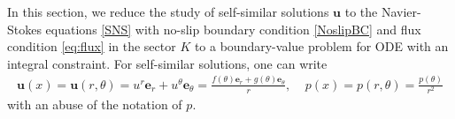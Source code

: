 \documentclass[reqno,12pt]{amsart}
\newcommand{\Bu}{{\boldsymbol{u}}}
\newcommand{\Be}{{\boldsymbol{e}}}
\begin{document}
In this section, we reduce the study of self-similar solutions $\Bu$ to the Navier-Stokes equations \eqref{SNS} with no-slip boundary condition \eqref{NoslipBC} and flux condition \eqref{eq:flux} in the sector $K$ to a boundary-value problem for ODE with an integral constraint. 
For self-similar solutions, one can  write
    \begin{align} \label{SSdec}
        \Bu(x)= \Bu(r,\theta)= u^r \Be_r +u^\theta \Be_\theta = 
        \frac{f(\theta)\Be_r + g(\theta) \Be_\theta}{r}, ~ ~ ~\ \ p(x) =p(r,\theta) = \frac{p(\theta)}{r^2}   \end{align}
    with an abuse of the notation of $p$.  
\end{document}
